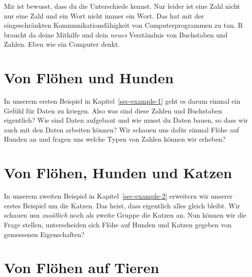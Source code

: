 \documentclass[
  letterpaper,
]{scrbook}
\begin{document}
\begin{tcolorbox}[enhanced jigsaw, coltitle=black, titlerule=0mm, bottomrule=.15mm, opacityback=0, opacitybacktitle=0.6, leftrule=.75mm, title=\textcolor{quarto-callout-note-color}{\faInfo}\hspace{0.5em}{Zahlen, Buchstaben und Wörter}, toprule=.15mm, bottomtitle=1mm, toptitle=1mm, left=2mm, breakable, arc=.35mm, colback=white, rightrule=.15mm, colbacktitle=quarto-callout-note-color!10!white, colframe=quarto-callout-note-color-frame]
Mir ist bewusst, dass du die Unterschiede kennst. Nur leider ist eine
Zahl nicht nur eine Zahl und ein Wort nicht immer ein Wort. Das hat mit
der eingeschränkten Kommunikationsfähigkeit von Computerprogrammen zu
tun. R braucht da deine Mithilfe und dein \emph{neues} Verständnis von
Buchstaben und Zahlen. Eben wie ein Computer denkt.
\end{tcolorbox}

\hypertarget{von-fluxf6hen-und-hunden}{%
\section*{Von Flöhen und Hunden}\label{von-fluxf6hen-und-hunden}}

In unserem ersten Beispiel in Kapitel~\ref{sec-example-1} geht es darum
einmal ein Gefühl für Daten zu kriegen. Also was sind diese Zahlen und
Buchstaben eigentlich? Wie sind Daten aufgebaut und wie musst du Daten
bauen, so dass wir auch mit den Daten arbeiten können? Wir schauen uns
dafür einmal Flöhe auf Hunden an und fragen uns welche Typen von Zahlen
können wir erheben?

\hypertarget{von-fluxf6hen-hunden-und-katzen}{%
\section*{Von Flöhen, Hunden und
Katzen}\label{von-fluxf6hen-hunden-und-katzen}}

In unserem zweiten Beispiel in Kapitel~\ref{sec-example-2} erweitern wir
unserer erstes Beispiel um die Katzen. Das heist, dass eigentlich alles
gleich bleibt. Wir schauen usn \emph{zusätlich} noch als zweite Gruppe
die Katzen an. Nun können wir die Frage stellen, unterscheiden sich
Flöhe auf Hunden und Katzen gegeben von gemessenen Eigenschaften?

\hypertarget{von-fluxf6hen-auf-tieren}{%
\section*{Von Flöhen auf Tieren}\label{von-fluxf6hen-auf-tieren}}
\end{document}

